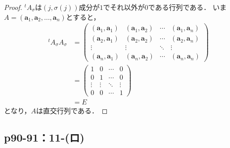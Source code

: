 \documentclass[a4paper,10pt,fleqn]{ltjsarticle}
\begin{document}
\begin{tleftbar}
    \begin{proof}
        ${}^t A_\sigma$は$(j,\sigma(j))$成分が$1$でそれ以外が$0$である行列である．
        いま$A = (\bm{a}_1,\bm{a}_2,\ldots,\bm{a}_n)$とすると，
        \begin{align*}
            {}^t A_\sigma A_\sigma & =
            \begin{pmatrix}
                (\bm{a}_1,\bm{a}_1) & (\bm{a}_1,\bm{a}_2) & \cdots & (\bm{a}_1,\bm{a}_n) \\
                (\bm{a}_2,\bm{a}_1) & (\bm{a}_2,\bm{a}_2) & \cdots & (\bm{a}_2,\bm{a}_n) \\
                \vdots              & \vdots              & \ddots & \vdots              \\
                (\bm{a}_n,\bm{a}_1) & (\bm{a}_n,\bm{a}_2) & \cdots & (\bm{a}_n,\bm{a}_n)
            \end{pmatrix}
            \\
                                   & = \begin{pmatrix} 1 & 0 & \cdots & 0 \\ 0 & 1 & \cdots & 0 \\ \vdots & \vdots & \ddots & \vdots \\ 0 & 0 & \cdots & 1 \end{pmatrix} \\
                                   & = E
        \end{align*}
        となり，$A$は直交行列である．
    \end{proof}
\end{tleftbar}

\subsection*{p90-91：11-(ロ)}
\end{document}
